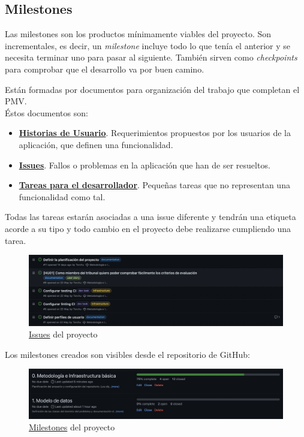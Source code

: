 \subsection{Milestones}
Las milestones son los productos mínimamente viables del proyecto. Son incrementales, es decir, un \textit{milestone}
incluye todo lo que tenía el anterior y se necesita terminar uno para pasar al siguiente. También sirven como
\textit{checkpoints} para comprobar que el desarrollo va por buen camino.

Están formadas por documentos para organización del
trabajo que completan el PMV.\\

Éstos documentos son:
\begin{itemize}
    \item \href{https://github.com/Torchu/flixbuff/labels/user story}{\textbf{Historias de Usuario}}. Requerimientos
    propuestos por los usuarios de la aplicación, que definen una funcionalidad.
    \item \href{https://github.com/Torchu/flixbuff/labels/issue}{\textbf{Issues}}. Fallos o problemas en la aplicación
    que han de ser resueltos.
    \item \href{https://github.com/Torchu/flixbuff/labels/dev task}{\textbf{Tareas para el desarrollador}}. Pequeñas
    tareas que no representan una funcionalidad como tal.
\end{itemize}

Todas las tareas estarán asociadas a una issue diferente y tendrán una etiqueta acorde a su tipo y todo cambio en el
proyecto debe realizarse cumpliendo una tarea.
\begin{figure}[H]
	\centering	
	\includegraphics[scale=0.3]{img/issues.png}
	\caption{\href{https://github.com/Torchu/flixbuff/issues}{Issues} del proyecto}\label{fig:github_issues}
\end{figure}

Los milestones creados son visibles desde el repositorio de GitHub:
\begin{figure}[H]
	\centering	
	\includegraphics[scale=0.3]{img/milestones.png}
	\caption{\href{https://github.com/Torchu/flixbuff/milestones}{Milestones} del proyecto}\label{fig:github_milestones}
\end{figure}

